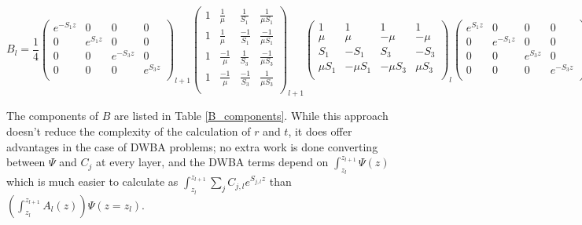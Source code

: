 \documentclass[%
 reprint,
 amsmath,
 amssymb,
 aps,
 prl,
 lengthcheck,%
]{revtex4-1}
\begin{document}
\begin{widetext}
\begin{equation}
B_l=\frac{1}{4}
  \left(
  \begin{matrix}
    e^{-S_1 z} & 0 & 0 & 0 \\[0.3em]
    0 & e^{S_1 z} & 0 & 0 \\[0.3em]
    0 & 0 & e^{-S_3 z} & 0 \\[0.3em]
    0 & 0 & 0 & e^{S_3 z} \\[0.3em]
  \end{matrix}
  \right)_{\!\!\!\!l+1}\!\!\!
  \left(
  \begin{matrix}
    1 & \frac{1}{\mu} & \frac{1}{S_1} & \frac{1}{\mu S_1} \\[0.3em]
    1 & \frac{1}{\mu} & \frac{-1}{S_1} & \frac{-1}{\mu S_1} \\[0.3em]
    1 & \frac{-1}{\mu} & \frac{1}{S_3} & \frac{-1}{\mu S_3} \\[0.3em]
    1 & \frac{-1}{\mu} & \frac{-1}{S_3} & \frac{1}{\mu S_3} \\[0.3em]
  \end{matrix}
  \right)_{\!\!\!\!l+1}\!\!\!
  \left(
  \begin{matrix}
    1 & 1 & 1 & 1 \\[0.3em]
    \mu & \mu & -\mu & -\mu \\[0.3em]
    S_1 & -S_1 & S_3 & -S_3 \\[0.3em]
    \mu S_1  & -\mu S_1 & -\mu S_3 & \mu S_3 \\[0.3em]
  \end{matrix}
  \right)_{\!\!\!\!l}
  \left(
  \begin{matrix}
    e^{S_1 z} & 0 & 0 & 0 \\[0.3em]
    0 & e^{-S_1 z} & 0 & 0 \\[0.3em]
    0 & 0 & e^{S_3 z} & 0 \\[0.3em]
    0 & 0 & 0 & e^{-S_3 z} \\[0.3em]
  \end{matrix}
  \right)_{\!\!\!\!l}
\end{equation}
\end{widetext}

The components of $B$ are listed in Table \ref{B_components}.
While this approach doesn't reduce the complexity of
the calculation of $r$ and $t$, it does offer advantages in the case of DWBA problems;
no extra work is done converting between $\Psi$ and $C_j$ at every layer, 
and the DWBA terms depend on $\int_{z_l}^{z_{l+1}} \Psi(z)$ which is much easier to
calculate as $\int_{z_l}^{z_{l+1}} \sum_j C_{j,l} e^{S_{j,l} z}$ than 
$\left(\int_{z_l}^{z_{l+1}} A_l(z)\right) \Psi(z=z_l)$.
\end{document}
